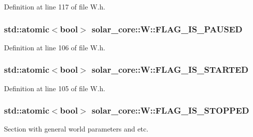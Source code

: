 Definition at line 117 of file W.\+h.

\hypertarget{classsolar__core_1_1_w_a1c0ebdba727a7a5cbf322072ab5c9184}{}
\subsubsection[{F\+L\+A\+G\+\_\+\+I\+S\+\_\+\+P\+A\+U\+S\+E\+D}]{\setlength{\rightskip}{0pt plus 5cm}std\+::atomic$<$bool$>$ solar\+\_\+core\+::\+W\+::\+F\+L\+A\+G\+\_\+\+I\+S\+\_\+\+P\+A\+U\+S\+E\+D}\label{classsolar__core_1_1_w_a1c0ebdba727a7a5cbf322072ab5c9184}


Definition at line 106 of file W.\+h.

\hypertarget{classsolar__core_1_1_w_a8456f88d45f2e8bf67eccd7f0c8d08fa}{}
\subsubsection[{F\+L\+A\+G\+\_\+\+I\+S\+\_\+\+S\+T\+A\+R\+T\+E\+D}]{\setlength{\rightskip}{0pt plus 5cm}std\+::atomic$<$bool$>$ solar\+\_\+core\+::\+W\+::\+F\+L\+A\+G\+\_\+\+I\+S\+\_\+\+S\+T\+A\+R\+T\+E\+D}\label{classsolar__core_1_1_w_a8456f88d45f2e8bf67eccd7f0c8d08fa}


Definition at line 105 of file W.\+h.

\hypertarget{classsolar__core_1_1_w_a9bb998c65a7427961de179f41e25daea}{}
\subsubsection[{F\+L\+A\+G\+\_\+\+I\+S\+\_\+\+S\+T\+O\+P\+P\+E\+D}]{\setlength{\rightskip}{0pt plus 5cm}std\+::atomic$<$bool$>$ solar\+\_\+core\+::\+W\+::\+F\+L\+A\+G\+\_\+\+I\+S\+\_\+\+S\+T\+O\+P\+P\+E\+D}\label{classsolar__core_1_1_w_a9bb998c65a7427961de179f41e25daea}
Section with general world parameters and etc. 

